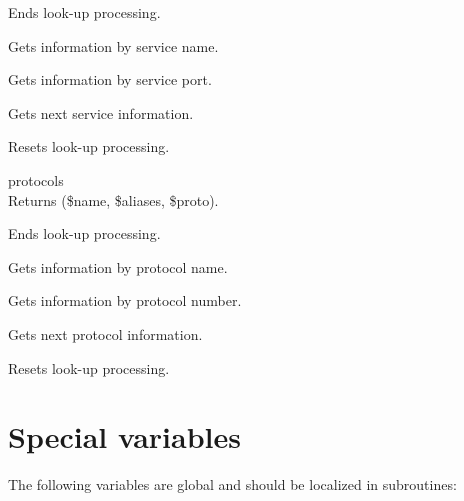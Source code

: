 \documentclass{refbase}
\begin{document}
\begin{enum}{6cm}

Ends look-up processing.

Gets information by service name. 

Gets information by service port.

Gets next service information.

Resets look-up processing.

\end{enum}

{\vskip6pt\largesl protocols} \\
Returns (\$name, \$aliases, \$proto).

\begin{enum}{6cm}

Ends look-up processing.

Gets information by protocol name.

Gets information by protocol number.

Gets next protocol information.

Resets look-up processing.

\end{enum}


\section{Special variables} 

The following variables are global and should be localized in subroutines:
\end{document}
